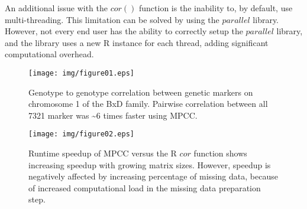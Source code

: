 \documentclass{bioinfo}
\begin{document}
An additional issue with the $cor()$ function is the inability to, by default, use
multi-threading. This limitation can be solved by using the $parallel$ library.
However, not every end user has the ability to correctly setup the $parallel$
library, and the library uses a new R instance for each thread, adding significant
computational overhead.
\vspace*{-5mm}
\begin{figure}[!t]
  \centerline{\texttt{[image: img/figure01.eps]}}
  \vspace*{-7mm}
  \caption{
    Genotype to genotype correlation between genetic markers on chromosome
    1 of the BxD family. Pairwise correlation between all 7321 marker was \textasciitilde{}6 times
    faster using MPCC.
  }
  \label{fig:fig1}
  \vspace*{-5mm}
\end{figure}
\begin{figure}[!t]
  \centerline{\texttt{[image: img/figure02.eps]}}
  \vspace*{-7mm}
  \caption{
    Runtime speedup of MPCC versus the R $cor$ function shows
    increasing speedup with growing matrix sizes. However,
    speedup is negatively affected by increasing percentage of
    missing data, because of increased computational load in the
    missing data preparation step.
  }
  \label{fig:fig2}
  \vspace*{-5mm}
\end{figure}
\end{document}
